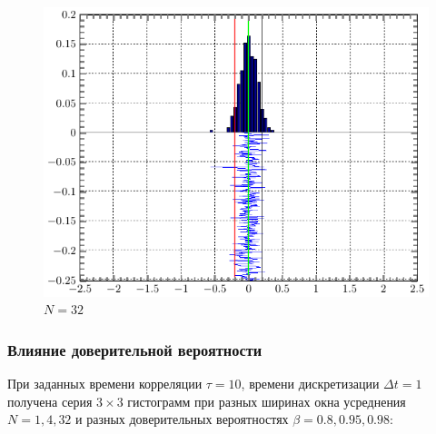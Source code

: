 \documentclass[a4paper,14pt]{extarticle}
\begin{document}
\begin{figure}[H]
    \centering
    \includegraphics[width=0.75\linewidth]{fig/gist_n32}
    \vspace{-0.7em}
    \caption{$N=32$}
    \label{fig:g32}
\end{figure}
\subsubsection{Влияние доверительной вероятности}
При заданных времени корреляции $\tau = 10$, времени дискретизации $\Delta t=1$ получена серия $3\times3$ гистограмм при разных ширинах окна усреднения $N=1, 4, 32$ и разных доверительных вероятностях $\beta=0.8, 0.95, 0.98$:
\end{document}
